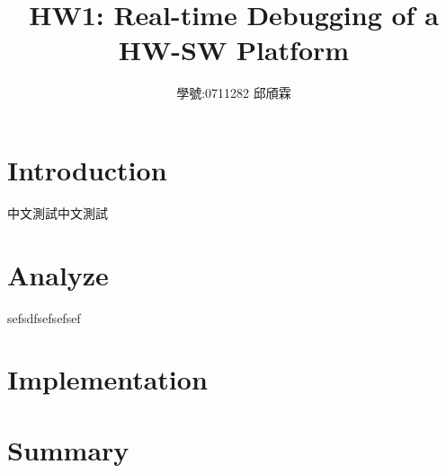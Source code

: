 \documentclass{article}
\title{\Large {HW1: Real-time Debugging of a HW-SW Platform}}
\author{學號:0711282 邱頎霖}
\date{}
\begin{document}
\begin{CJK*}{UTF8}{bkai}
\setlength{\columnsep}{5cm}

\vspace*{-150pt}
    {\let\newpage\relax\maketitle}

\begin{multicols}{2}


\section{Introduction}


中文測試中文測試

\section{Analyze}

sefsdfsefsefsef

\section{Implementation}

\section{Summary}

\section{}

\end{multicols}

\end{CJK*}
\end{document}
